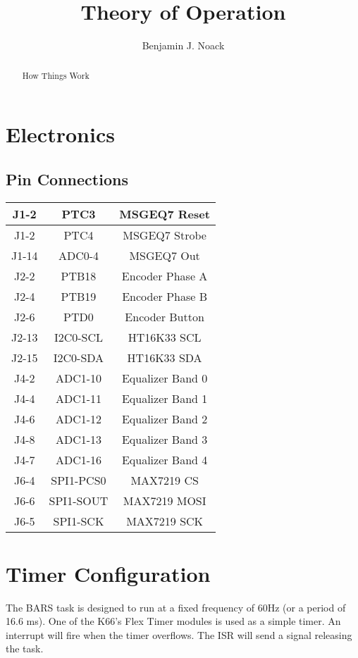 \documentclass[12pt,a4paper]{article}
\title{Theory of Operation}
\author{Benjamin J. Noack}
\begin{document}
\maketitle
\begin{abstract}
	How Things Work
\end{abstract}

\section{Electronics}

\subsection{Pin Connections}

\begin{tabular}{| c| c| c|}
	\hline
	J1-2 & PTC3 & MSGEQ7 Reset \\
	\hline
	J1-2 & PTC4 & MSGEQ7 Strobe \\
	\hline
	J1-14 & ADC0-4 & MSGEQ7 Out \\
	\hline
	J2-2 & PTB18 & Encoder Phase A \\
	\hline
	J2-4 & PTB19 & Encoder Phase B \\
	\hline
	J2-6 & PTD0 & Encoder Button \\
	\hline
	J2-13 & I2C0-SCL & HT16K33 SCL \\
	\hline
	J2-15 & I2C0-SDA & HT16K33 SDA \\
	\hline
	J4-2 & ADC1-10 & Equalizer Band 0 \\
	\hline
	J4-4 & ADC1-11 & Equalizer Band 1 \\
	\hline
	J4-6 & ADC1-12 & Equalizer Band 2 \\
	\hline
	J4-8 & ADC1-13 & Equalizer Band 3 \\
	\hline
	J4-7 & ADC1-16 & Equalizer Band 4 \\
	\hline
	J6-4 & SPI1-PCS0 & MAX7219 CS \\
	\hline
	J6-6 & SPI1-SOUT & MAX7219 MOSI \\
	\hline
	J6-5 & SPI1-SCK & MAX7219 SCK \\
	\hline
\end{tabular}

\appendix
\section{Timer Configuration}

The BARS task is designed to run at a fixed frequency of 60Hz (or a period of 16.6 ms).
One of the K66's Flex Timer modules is used as a simple timer.
An interrupt will fire when the timer overflows.
The ISR will send a signal releasing the task.
\end{document}
